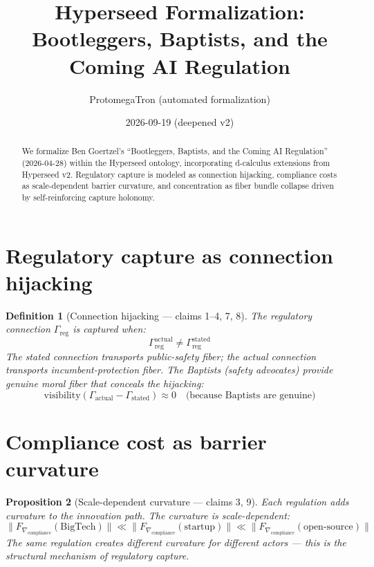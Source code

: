 \documentclass[11pt,a4paper]{article}
\title{Hyperseed Formalization:\\
  Bootleggers, Baptists, and the Coming AI Regulation}
\author{ProtomegaTron (automated formalization)}
\date{2026-09-19 (deepened v2)}
\newtheorem{definition}{Definition}[section]
\newtheorem{proposition}[definition]{Proposition}
\begin{document}
\maketitle

\begin{abstract}
We formalize Ben Goertzel's ``Bootleggers, Baptists, and the Coming AI
Regulation'' (2026-04-28) within the Hyperseed ontology, incorporating
d-calculus extensions from Hyperseed v2. Regulatory capture is modeled
as connection hijacking, compliance costs as scale-dependent barrier
curvature, and concentration as fiber bundle collapse driven by
self-reinforcing capture holonomy.
\end{abstract}

\tableofcontents

\section{Regulatory capture as connection hijacking}

\begin{definition}[Connection hijacking --- claims 1--4, 7, 8]
The regulatory connection $\Gamma_{\text{reg}}$ is \emph{captured} when:
\[
  \Gamma_{\text{reg}}^{\text{actual}} \neq \Gamma_{\text{reg}}^{\text{stated}}
\]
The stated connection transports public-safety fiber; the actual connection
transports incumbent-protection fiber. The Baptists (safety advocates)
provide genuine moral fiber that conceals the hijacking:
\[
  \text{visibility}(\Gamma_{\text{actual}} - \Gamma_{\text{stated}}) \approx 0
  \quad \text{(because Baptists are genuine)}
\]
\end{definition}

\section{Compliance cost as barrier curvature}

\begin{proposition}[Scale-dependent curvature --- claims 3, 9]
\label{prop:barrier}
Each regulation adds curvature to the innovation path. The curvature is
scale-dependent:
\[
  \|F_{\nabla_{\text{compliance}}}(\text{BigTech})\| \ll
  \|F_{\nabla_{\text{compliance}}}(\text{startup})\| \ll
  \|F_{\nabla_{\text{compliance}}}(\text{open-source})\|
\]
The same regulation creates different curvature for different actors ---
this is the structural mechanism of regulatory capture.
\end{proposition}
\end{document}
